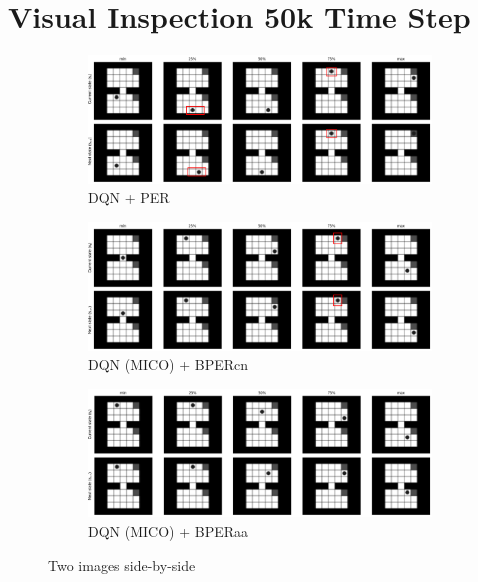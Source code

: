 \section{Visual Inspection 50k Time Step}
\label{append:visual_inspection_50k}

\begin{figure}[H]
    \centering
    \begin{subfigure}{1.\textwidth}
    \includegraphics[width=\linewidth]{Results/grid_world/quartiles_images_per_50k.png}
        \caption{DQN + PER}
        \label{fig:quartiles_images_per_50k}
    \end{subfigure}
    \begin{subfigure}{1.\textwidth}
        \includegraphics[width=\linewidth]{Results/grid_world/quartiles_images_dqn_mico_bpercn_50k.png}
        \caption{DQN (MICO) + BPERcn}
        \label{fig:quartiles_images_dqn_mico_bpercn_50k}
    \end{subfigure}
    \begin{subfigure}{1.\textwidth}
        \includegraphics[width=\linewidth]{Results/grid_world/quartiles_images_dqn_mico_bperaa_50k.png}
        \caption{DQN (MICO) + BPERaa}
        \label{fig:quartiles_images_dqn_mico_bperaa_50k}
    \end{subfigure}
    \caption{Two images side-by-side}
    \label{fig:quartiles_all_methods_50k}
\end{figure}

